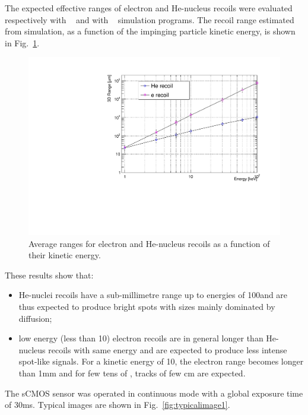\documentclass[12pt]{iopart}
\begin{document}
The expected effective ranges of electron and He-nucleus recoils were
evaluated respectively with \GEANTfour~\cite{GEANT4} and with
\SRIM~\cite{bib:srim} simulation programs. The recoil range estimated
from simulation, as a function of the impinging particle kinetic
energy, is shown in Fig.~\ref{fig:range}. 
%
\begin{figure}[ht]
  \begin{center}
    \includegraphics[width=0.49\linewidth]{figures/range_ER_NR.pdf}
    \caption{Average ranges for electron and He-nucleus recoils as a
      function of their kinetic energy.
      \label{fig:range}}
      \end{center}
\end{figure}
%
These results show that:
\begin{itemize}
    \item He-nuclei recoils have a sub-millimetre range up to energies
      of 100\keV and are thus expected to produce bright spots with
      sizes mainly dominated by diffusion;
    \item low energy (less than 10\keV) electron recoils are in
      general longer than He-nucleus recoils with same energy and are
      expected to produce less intense spot-like signals. For a
      kinetic energy of 10\keV, the electron range becomes longer than
      1\unit{mm} and for few tens of \keV, tracks of few cm are
      expected.
\end{itemize}


The sCMOS sensor was operated in continuous mode with a global
exposure time of 30\unit{ms}. Typical images are shown in Fig.~\ref{fig:typicalimage1}. 
\end{document}

